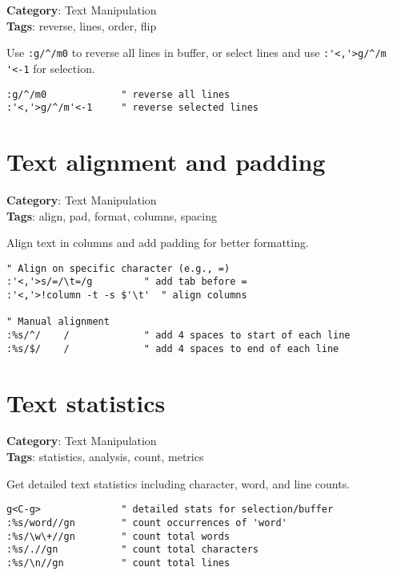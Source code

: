 {{{{{{{{{{{{{{{\textbf{Category}: Text Manipulation\\ \textbf{Tags}: reverse, lines, order, flip
\vspace{0.5cm}

Use {\footnotesize \Verb§:g/^/m0§} to reverse all lines in buffer, or select lines and use {\footnotesize \Verb§:'<,'>g/^/m '<-1§} for selection.

\begin{Exa*}{}
\begin{Verbatim}[fontsize=\footnotesize, breaklines, breakanywhere]
:g/^/m0             " reverse all lines
:'<,'>g/^/m'<-1     " reverse selected lines
\end{Verbatim}
\end{Exa*}

\section{Text alignment and padding}

\textbf{Category}: Text Manipulation\\ \textbf{Tags}: align, pad, format, columns, spacing
\vspace{0.5cm}

Align text in columns and add padding for better formatting.

\begin{Exa*}{}
\begin{Verbatim}[fontsize=\footnotesize, breaklines, breakanywhere]
" Align on specific character (e.g., =)
:'<,'>s/=/\t=/g         " add tab before =
:'<,'>!column -t -s $'\t'  " align columns

" Manual alignment
:%s/^/    /             " add 4 spaces to start of each line
:%s/$/    /             " add 4 spaces to end of each line
\end{Verbatim}
\end{Exa*}

\section{Text statistics}

\textbf{Category}: Text Manipulation\\ \textbf{Tags}: statistics, analysis, count, metrics
\vspace{0.5cm}

Get detailed text statistics including character, word, and line counts.

\begin{Exa*}{}
\begin{Verbatim}[fontsize=\footnotesize, breaklines, breakanywhere]
g<C-g>              " detailed stats for selection/buffer
:%s/word//gn        " count occurrences of 'word'
:%s/\w\+//gn        " count total words
:%s/.//gn           " count total characters
:%s/\n//gn          " count total lines
\end{Verbatim}
\end{Exa*}

}}}}}}}}}}}}}}}
